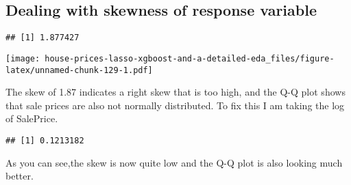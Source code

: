 \documentclass[]{article}
\newenvironment{Shaded}{\begin{snugshade}}{\end{snugshade}}
\newcommand{\KeywordTok}[1]{\textcolor[rgb]{0.13,0.29,0.53}{\textbf{#1}}}
\newcommand{\StringTok}[1]{\textcolor[rgb]{0.31,0.60,0.02}{#1}}
\newcommand{\CommentTok}[1]{\textcolor[rgb]{0.56,0.35,0.01}{\textit{#1}}}
\newcommand{\OperatorTok}[1]{\textcolor[rgb]{0.81,0.36,0.00}{\textbf{#1}}}
\newcommand{\NormalTok}[1]{#1}
\begin{document}
\subsection{Dealing with skewness of response
variable}\label{dealing-with-skewness-of-response-variable}

\begin{Shaded}
\end{Shaded}

\begin{verbatim}
## [1] 1.877427
\end{verbatim}

\begin{Shaded}
\end{Shaded}

\texttt{[image: house-prices-lasso-xgboost-and-a-detailed-eda\_files/figure-latex/unnamed-chunk-129-1.pdf]}

The skew of 1.87 indicates a right skew that is too high, and the Q-Q
plot shows that sale prices are also not normally distributed. To fix
this I am taking the log of SalePrice.

\begin{Shaded}
\end{Shaded}

\begin{verbatim}
## [1] 0.1213182
\end{verbatim}

As you can see,the skew is now quite low and the Q-Q plot is also
looking much better.

\begin{Shaded}
\end{Shaded}
\end{document}
